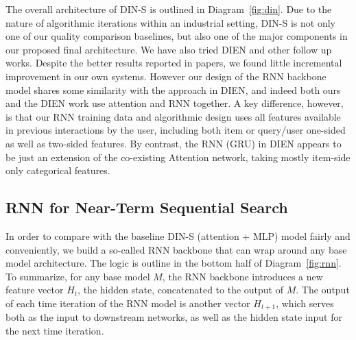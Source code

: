 The overall architecture of DIN-S is outlined in Diagram~\ref{fig:din}. Due to the nature of algorithmic iterations within an industrial setting, DIN-S is not only one of our quality comparison baselines, but also one of the major components in our proposed final architecture.
We have also tried DIEN \cite{zhou2019deep} and other follow up works. Despite the better results reported in papers, we found little incremental improvement in our own systems. However our design of the RNN backbone model shares some similarity with the approach in DIEN, and indeed both ours and the DIEN work use attention and RNN together. A key difference, however, is that our RNN training data and algorithmic design uses all features available in previous interactions by the user, including both item or query/user one-sided as well as two-sided features. By contrast, the RNN (GRU) in DIEN appears to be just an extension of the co-existing Attention network, taking mostly item-side only categorical features.

\subsection{RNN for Near-Term Sequential Search}
\label{sec:rnn}
In order to compare with the baseline DIN-S (attention + MLP) model fairly and conveniently, we build a so-called RNN backbone that can wrap around any base model architecture. The logic is outline in the bottom half of Diagram~\ref{fig:rnn}. To summarize, for any base model $M$, the RNN backbone introduces a new feature vector $H_t$, the hidden state, concatenated to the output of $M$. The output of each time iteration of the RNN model is another vector $H_{t+1}$, which serves both as the input to downstream networks, as well as the hidden state input for the next time iteration. 

